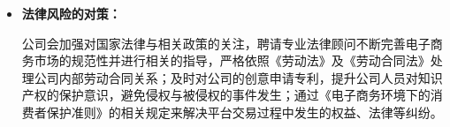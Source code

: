 \documentclass[UTF8,12pt]{ctexart}
\numberwithin{figure}{section}%
\begin{document}
\begin{spacing}{2}
\begin{itemize}
	\item \textbf{法律风险的对策：}
	
	公司会加强对国家法律与相关政策的关注，聘请专业法律顾问不断完善电子商务市场的规范性并进行相关的指导，严格依照《劳动法》及《劳动合同法》处理公司内部劳动合同关系；及时对公司的创意申请专利，提升公司人员对知识产权的保护意识，避免侵权与被侵权的事件发生；通过《电子商务环境下的消费者保护准则》的相关规定来解决平台交易过程中发生的权益、法律等纠纷。
	
\end{itemize}




\end{spacing}

\ClearShipoutPicture
\end{document}
